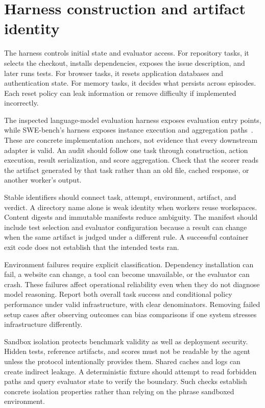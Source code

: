 \section{Harness construction and artifact identity}\label{sec:C26:construction}
The harness controls initial state and evaluator access. For repository tasks, it selects the checkout, installs dependencies, exposes the issue description, and later runs tests. For browser tasks, it resets application databases and authentication state. For memory tasks, it decides what persists across episodes. Each reset policy can leak information or remove difficulty if implemented incorrectly.

The inspected language-model evaluation harness exposes evaluation entry points, while SWE-bench's harness exposes instance execution and aggregation paths~\cite{repo_lm_eval,jimenez2023swebench}. These are concrete implementation anchors, not evidence that every downstream adapter is valid. An audit should follow one task through construction, action execution, result serialization, and score aggregation. Check that the scorer reads the artifact generated by that task rather than an old file, cached response, or another worker's output.

Stable identifiers should connect task, attempt, environment, artifact, and verdict. A directory name alone is weak identity when workers reuse workspaces. Content digests and immutable manifests reduce ambiguity. The manifest should include test selection and evaluator configuration because a result can change when the same artifact is judged under a different rule. A successful container exit code does not establish that the intended tests ran.

Environment failures require explicit classification. Dependency installation can fail, a website can change, a tool can become unavailable, or the evaluator can crash. These failures affect operational reliability even when they do not diagnose model reasoning. Report both overall task success and conditional policy performance under valid infrastructure, with clear denominators. Removing failed setup cases after observing outcomes can bias comparisons if one system stresses infrastructure differently.

Sandbox isolation protects benchmark validity as well as deployment security. Hidden tests, reference artifacts, and scores must not be readable by the agent unless the protocol intentionally provides them. Shared caches and logs can create indirect leakage. A deterministic fixture should attempt to read forbidden paths and query evaluator state to verify the boundary. Such checks establish concrete isolation properties rather than relying on the phrase sandboxed environment.


